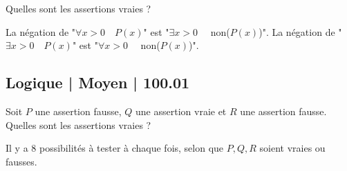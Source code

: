 \begin{question}

Quelles sont les assertions vraies ?
\begin{answers}



\end{answers}
\begin{explanations}
La négation de "$\forall x > 0 \quad P(x)$" est "$\exists x > 0 \quad$ non($P(x)$)".
La négation de "$\exists x > 0 \quad P(x)$" est "$\forall x > 0 \quad$ non($P(x)$)".
\end{explanations}
\end{question}

\subsection{Logique | Moyen | 100.01}


\begin{question}

Soit $P$ une assertion fausse, $Q$ une assertion vraie et $R$ une assertion fausse. Quelles sont les assertions vraies ?
\begin{answers}



\end{answers}
\begin{explanations}
Il y a 8 possibilités à tester à chaque fois, selon que $P,Q,R$ soient vraies ou fausses.
\end{explanations}
\end{question}


